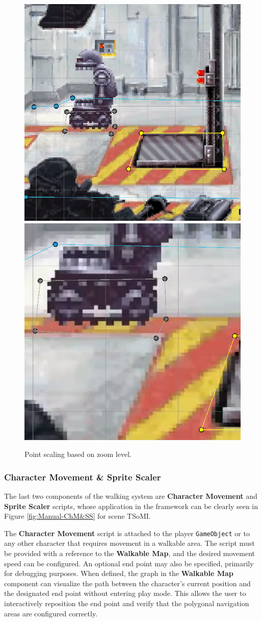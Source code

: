 \begin{figure}[H]
\centering
\includegraphics[width=.48\linewidth]{img/User doc/point_scaling.png}
\includegraphics[width=.48\linewidth]{img/User doc/point_scaling2.png}
\caption{Point scaling based on zoom level.}
\label{fig:Manual-Zoom}
\end{figure}

\subsubsection{Character Movement \& Sprite Scaler}
The last two components of the walking system are \textbf{Character Movement} and \textbf{Sprite Scaler} scripts, whose application in the framework can be clearly seen in Figure \ref{fig:Manual-ChM&SS} for scene TSoMI. 

The \textbf{Character Movement} script is attached to the player \verb|GameObject| or to any other character that requires movement in a walkable area. The script must be provided with a reference to the \textbf{Walkable Map}, and the desired movement speed can be configured. An optional end point may also be specified, primarily for debugging purposes. When defined, the graph in the \textbf{Walkable Map} component can visualize the path between the character's current position and the designated end point without entering play mode. This allows the user to interactively reposition the end point and verify that the polygonal navigation areas are configured correctly.

